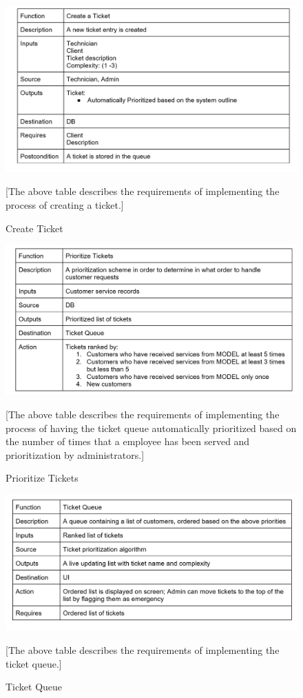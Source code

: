 \documentclass[letterpaper]{article}
\begin{document}
\begin{figure}[htbp]
  \includegraphics[scale = .5]{MakeTicket}
  \caption{Create Ticket}[The above table describes the requirements of implementing the process of creating a ticket.]
  \centering
\end{figure}


\begin{figure}[htbp]
  \includegraphics[scale = .5]{PrioTicket}
  \caption{Prioritize Tickets}[The above table describes the requirements of implementing the process of having the ticket queue automatically prioritized based on the number of times that a employee has been served and prioritization by administrators.]
  \centering
\end{figure}

\begin{figure}[htbp]
  \includegraphics[scale = .5]{TicketQueue}
  \caption{Ticket Queue}[The above table describes the requirements of implementing the ticket queue.]
  \centering
\end{figure}
\end{document}
